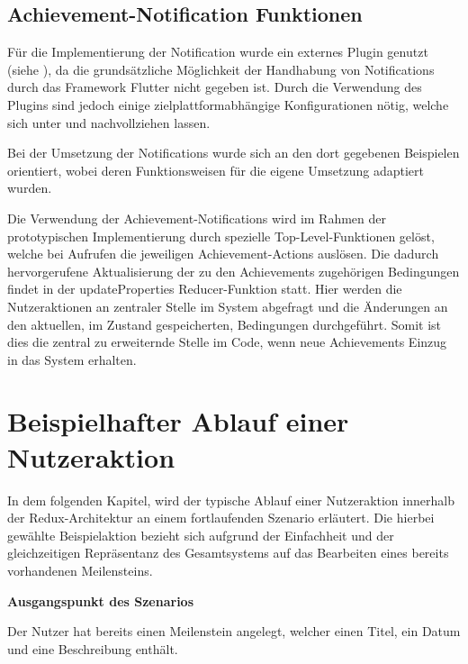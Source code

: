 \documentclass[bibliography=totoc,listof=totoc,BCOR=5mm,DIV=12,oneside]{scrbook}
\begin{document}
\subsection{Achievement-Notification Funktionen}
\par Für die Implementierung der Notification wurde ein externes Plugin genutzt (siehe \citep{FlutterLocalNotificationPlugin}), da die grundsätzliche Möglichkeit der Handhabung von Notifications durch das Framework Flutter nicht gegeben ist. Durch die Verwendung des Plugins sind jedoch einige zielplattformabhängige Konfigurationen nötig, welche sich unter \citep[Android Integration]{FlutterLocalNotificationPlugin} und \citep[iOS Integration]{FlutterLocalNotificationPlugin} nachvollziehen lassen.
\par \medskip Bei der Umsetzung der Notifications wurde sich an den dort gegebenen Beispielen orientiert, wobei deren Funktionsweisen für die eigene Umsetzung adaptiert wurden.
\par Die Verwendung der Achievement-Notifications wird im Rahmen der prototypischen Implementierung durch spezielle Top-Level-Funktionen gelöst, welche bei Aufrufen die jeweiligen Achievement-Actions auslösen. Die dadurch hervorgerufene Aktualisierung der zu den Achievements zugehörigen Bedingungen findet in der updateProperties Reducer-Funktion statt. Hier werden die Nutzeraktionen an zentraler Stelle im System abgefragt und die Änderungen an den aktuellen, im Zustand gespeicherten, Bedingungen durchgeführt. Somit ist dies die zentral zu erweiternde Stelle im Code, wenn neue Achievements Einzug in das System erhalten.

\newpage
\section{Beispielhafter Ablauf einer Nutzeraktion}
\par In dem folgenden Kapitel, wird der typische Ablauf einer Nutzeraktion innerhalb der Redux-Architektur an einem fortlaufenden Szenario erläutert. Die hierbei gewählte Beispielaktion bezieht sich aufgrund der Einfachheit und der gleichzeitigen Repräsentanz des Gesamtsystems auf das Bearbeiten eines bereits vorhandenen Meilensteins.

\par \bigskip \textbf{Ausgangspunkt des Szenarios}
\par Der Nutzer hat bereits einen Meilenstein angelegt, welcher einen Titel, ein Datum und eine Beschreibung enthält.
\end{document}
